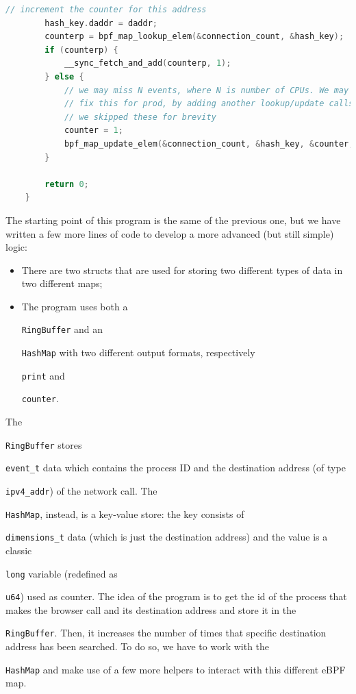 \begin{lstlisting}[style=cstyle, language=C, caption={Code of the modified program starting from the first one created using \colorbox{backcolour}{\lstinline[style=commandline, language=bash]|bee|}.}]
		// increment the counter for this address
		hash_key.daddr = daddr;
		counterp = bpf_map_lookup_elem(&connection_count, &hash_key);
		if (counterp) {
			__sync_fetch_and_add(counterp, 1);
		} else {
			// we may miss N events, where N is number of CPUs. We may want to 
			// fix this for prod, by adding another lookup/update calls here.
			// we skipped these for brevity
			counter = 1;
			bpf_map_update_elem(&connection_count, &hash_key, &counter, BPF_NOEXIST);
		}
		
		return 0;
	}
\end{lstlisting}

The starting point of this program is the same of the previous one, but we have written a few more lines of code to develop a more advanced (but still simple) logic:

\begin{itemize}
	\item 
		There are two structs that are used for storing two different types of data in two different maps;
	\item 
		The program uses both a \raggedright\colorbox{backcolour}{\lstinline[style=commandline, language=bash]|RingBuffer|} and an \raggedright\colorbox{backcolour}{\lstinline[style=commandline, language=bash]|HashMap|} with two different output formats, respectively \raggedright\colorbox{backcolour}{\lstinline[style=commandline, language=bash]|print|} and \raggedright\colorbox{backcolour}{\lstinline[style=commandline, language=bash]|counter|}.
\end{itemize}

The \raggedright\colorbox{backcolour}{\lstinline[style=commandline, language=bash]|RingBuffer|} stores \raggedright\colorbox{backcolour}{\lstinline[style=commandline, language=bash]|event_t|} data which contains the process ID and the destination address (of type \raggedright\colorbox{backcolour}{\lstinline[style=commandline, language=bash]|ipv4_addr|}) of the network call.
The \raggedright\colorbox{backcolour}{\lstinline[style=commandline, language=bash]|HashMap|}, instead, is a key-value store: the key consists of \raggedright\colorbox{backcolour}{\lstinline[style=commandline, language=bash]|dimensions_t|} data (which is just the destination address) and the value is a classic \raggedright\colorbox{backcolour}{\lstinline[style=commandline, language=bash]|long|} variable (redefined as \raggedright\colorbox{backcolour}{\lstinline[style=commandline, language=bash]|u64|}) used as counter.
The idea of the program is to get the id of the process that makes the browser call and its destination address and store it in the \raggedright\colorbox{backcolour}{\lstinline[style=commandline, language=bash]|RingBuffer|}.
Then, it increases the number of times that specific destination address has been searched.
To do so, we have to work with the \raggedright\colorbox{backcolour}{\lstinline[style=commandline, language=bash]|HashMap|} and make use of a few more helpers to interact with this different eBPF map. 

